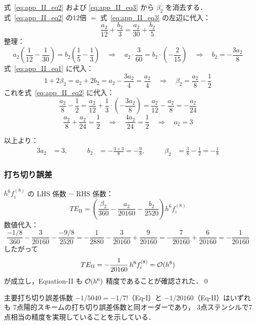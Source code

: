 式~\eqref{eq:app_II_eq2} および \eqref{eq:app_II_eq3} から $\beta_2$ を消去する．
式~\eqref{eq:app_II_eq2} の12倍 $=$ 式~\eqref{eq:app_II_eq3} の左辺に代入：
\[
  \frac{a_2}{12} + \frac{b_2}{3} = \frac{a_2}{30} + \frac{b_2}{5}
\]
整理：
\[
  a_2\!\left(\frac{1}{12}-\frac{1}{30}\right) = b_2\!\left(\frac{1}{5}-\frac{1}{3}\right)
  \quad\Longrightarrow\quad
  a_2\cdot\frac{3}{60} = b_2\cdot\!\left(-\frac{2}{15}\right)
  \quad\Longrightarrow\quad
  b_2 = -\frac{3a_2}{8}
\]
式~\eqref{eq:app_II_eq1} に代入：
\[
  1 + 2\beta_2 = a_2 + 2b_2 = a_2 - \frac{3a_2}{4} = \frac{a_2}{4}
  \quad\Longrightarrow\quad
  \beta_2 = \frac{a_2}{8} - \frac{1}{2}
\]
これを式~\eqref{eq:app_II_eq2} に代入：
\[
  \frac{a_2}{8} - \frac{1}{2} = \frac{a_2}{12} + \frac{1}{3}\cdot\!\left(-\frac{3a_2}{8}\right)
  = \frac{a_2}{12} - \frac{a_2}{8}
  = -\frac{a_2}{24}
\]
\[
  \frac{a_2}{8} + \frac{a_2}{24} = \frac{1}{2}
  \quad\Longrightarrow\quad
  \frac{4a_2}{24} = \frac{1}{2}
  \quad\Longrightarrow\quad
  a_2 = 3
\]

以上より：
\begin{alignat}{3}
  a_2 &= 3, \qquad
  &b_2 &= -\frac{3\times3}{8} = -\frac{9}{8}, \qquad
  &\beta_2 &= \frac{3}{8} - \frac{1}{2} = -\frac{1}{8}
\end{alignat}

\subsubsection*{打ち切り誤差}

$h^6 f^{(8)}_i$ の LHS 係数 $-$ RHS 係数：
\[
  TE_{\mathrm{II}} = \left(\frac{\beta_2}{360} - \frac{a_2}{20160} - \frac{b_2}{2520}\right)h^6 f^{(8)}_i
\]
数値代入：
\[
  \frac{-1/8}{360} - \frac{3}{20160} - \frac{-9/8}{2520}
  = -\frac{1}{2880} - \frac{3}{20160} + \frac{9}{20160}
  = -\frac{7}{20160} + \frac{6}{20160}
  = -\frac{1}{20160}
\]
したがって
\[
  TE_{\mathrm{II}} = -\frac{1}{20160}\,h^6 f^{(8)}_i = \mathcal{O}(h^6)
\]
が成立し，Equation-II も $\mathcal{O}(h^6)$ 精度であることが確認された．\qed

\medskip
\noindent
主要打ち切り誤差係数 $-1/5040 = -1/7!$（Eq-I）と $-1/20160$（Eq-II）はいずれも
7点陽的スキームの打ち切り誤差係数と同オーダーであり，
3点ステンシルで7点相当の精度を実現していることを示している．


